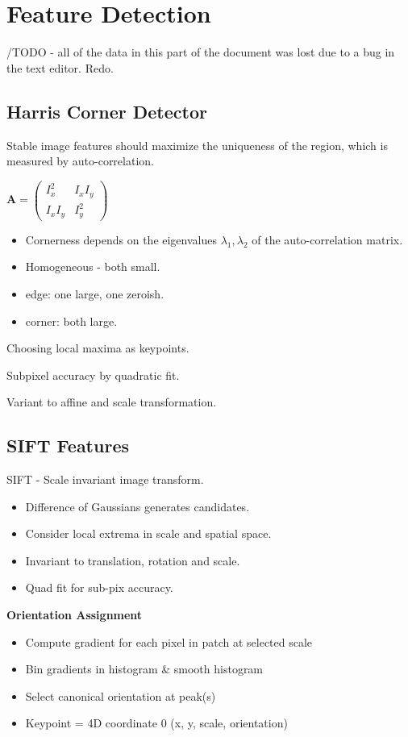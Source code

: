 \section{Feature Detection}

/TODO - all of the data in this part of the document was lost due to a bug in the text editor. Redo.

\subsection{Harris Corner Detector}

Stable image features should maximize the uniqueness of the region, which is measured by auto-correlation.

$ \mathbf{A} = \left(  \begin{matrix} I_x^2 &  I_xI_y \\
I_xI_y & I_y^2
\end{matrix} \right) $

\begin{itemize}
\item Cornerness depends on the eigenvalues $\lambda_1,\lambda_2$ of the auto-correlation matrix.
\item Homogeneous - both small.
\item edge: one large, one zeroish.
\item corner: both large.
\end{itemize}

Choosing local maxima as keypoints. 

Subpixel accuracy by quadratic fit.

Variant to affine and scale transformation.

\subsection{SIFT Features}

SIFT - Scale invariant image transform.

\begin{itemize}
\item Difference of Gaussians generates candidates. 
\item Consider local extrema in scale and spatial space.
\item Invariant to translation, rotation and scale.
\item Quad fit for sub-pix accuracy.
\end{itemize}

\textbf{Orientation Assignment}
\begin{itemize}
\item  Compute gradient for each pixel in patch at selected scale
\item  Bin gradients in histogram \& smooth histogram
\item  Select canonical orientation at peak(s)
\item  Keypoint = 4D coordinate 0 (x, y, scale, orientation)
\end{itemize}

